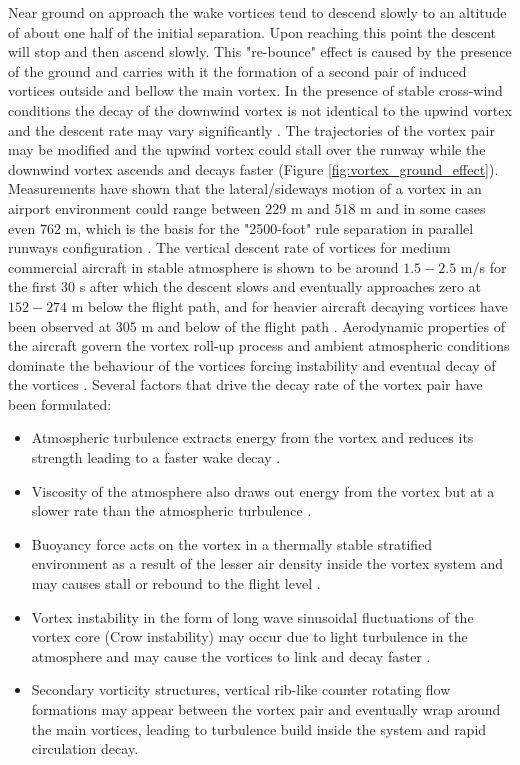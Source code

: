 Near ground on approach the wake vortices tend to descend slowly to an altitude of about one half of the initial separation.
Upon reaching this point the descent will stop and then ascend slowly. This "re-bounce" effect is caused by the presence of the ground and carries with it the formation of a second pair of induced vortices outside and bellow the main vortex. 
In the presence of stable cross-wind conditions the decay of the downwind vortex is not identical to the upwind vortex and the descent rate may vary significantly \cite{Hallock2018Apr}. 
The trajectories of the vortex pair may be modified and the upwind vortex could stall over the runway while the downwind vortex ascends and decays faster (Figure \ref{fig:vortex_ground_effect}).
Measurements have shown that the lateral/sideways motion of a vortex in an airport environment could range between $229$ m and $518$ m and in some cases even $762$ m, which is the basis for the "2500-foot"  rule separation in parallel runways configuration \cite{Hallock2018Apr, hallock2004summary, hallock2003wake}. The vertical descent rate of vortices for medium commercial aircraft in stable atmosphere  is shown to be around $1.5-2.5$ m/s for the first $30$ s after which the descent slows and eventually approaches zero at $152-274$ m below the flight path, and for heavier aircraft decaying vortices have been observed at $305$ m and below of the flight path  \cite{lissaman1973aircraft, Hallock2018Apr}. 
Aerodynamic properties of the aircraft govern the vortex roll-up process and ambient atmospheric conditions dominate the behaviour of the vortices forcing instability and eventual decay of the vortices \cite{Hallock2018Apr}.
Several factors that drive the decay rate of the vortex pair have been formulated:
\begin{itemize}
    \item Atmospheric turbulence extracts energy from the vortex and reduces its strength leading to a faster wake decay \cite{Hallock2018Apr}.
    \item Viscosity of the atmosphere also draws out energy from the vortex but at a slower rate than the atmospheric turbulence \cite{Hallock2018Apr}.
    \item Buoyancy force acts on the vortex in a thermally stable stratified environment as a result of the lesser air density inside the vortex system and may causes stall or rebound to the flight level \cite{Holzapfel2001Feb, gerz_commercial_2002}.
    \item Vortex instability in the form of long wave sinusoidal fluctuations of the vortex core (Crow instability) may occur due to light turbulence in the atmosphere and may cause the vortices to link and decay faster \cite{Hallock2018Apr, crow2003stability}.
    \item Secondary vorticity structures, vertical rib-like counter rotating flow formations may appear between the vortex pair and eventually wrap around the main vortices, leading to turbulence build inside the system and rapid circulation decay\cite{Holzapfel2001Feb, Holzapfel2003Jun}.
\end{itemize}


